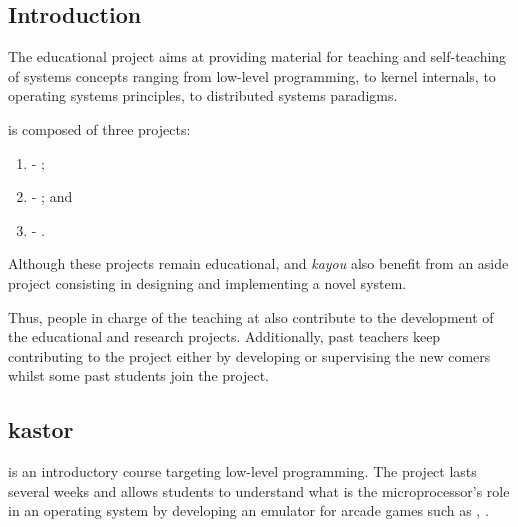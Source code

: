 \begin{multicols}{2}

%
%

\tableofcontents

%
%

\indentation{}

%
%

\section{Introduction}

The  educational project aims at providing material for teaching
and self-teaching of systems concepts ranging from low-level programming,
to kernel internals, to operating systems principles, to distributed systems
paradigms.

 is composed of three projects:

\begin{enumerate}
  \item
     - ;
  \item
     - ; and
  \item
     - .
\end{enumerate}

Although these projects remain educational,  and \textit{kayou}
also benefit from an aside  project consisting in designing and
implementing a novel system.

Thus, people in charge of the teaching at  also contribute to
the development of the educational and research projects. Additionally, past
teachers keep contributing to the project either by developing or supervising
the new comers whilst some past students join the project.

%
%

\subsection{kastor}

 is an introductory course targeting low-level programming. The
project lasts several weeks and allows students to understand what is the
microprocessor's role in an operating system by developing an emulator for
arcade games such as ,  \etc{}.


\end{multicols}
